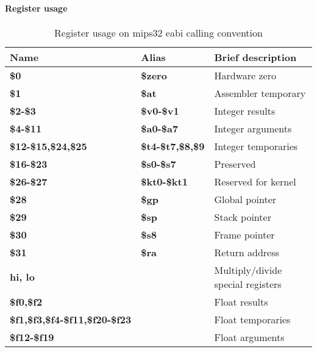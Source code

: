 \paragraph{Register usage}

\begin{table}[h]
\begin{tabular}{lll}
\hline
Name                                   & Alias                   & Brief description\\
\hline
{\bf \$0}                              & {\bf \$zero}            & Hardware zero \\
{\bf \$1}                              & {\bf \$at}              & Assembler temporary \\
{\bf \$2-\$3}                          & {\bf \$v0-\$v1}         & Integer results \\
{\bf \$4-\$11}                         & {\bf \$a0-\$a7}         & Integer arguments\\
{\bf \$12-\$15,\$24,\$25}              & {\bf \$t4-\$t7,\$8,\$9} & Integer temporaries \\
{\bf \$16-\$23}                        & {\bf \$s0-\$s7}         & Preserved \\
{\bf \$26-\$27}                        & {\bf \$kt0-\$kt1}       & Reserved for kernel \\
{\bf \$28}                             & {\bf \$gp}              & Global pointer \\
{\bf \$29}                             & {\bf \$sp}              & Stack pointer \\
{\bf \$30}                             & {\bf \$s8}              & Frame pointer \\
{\bf \$31}                             & {\bf \$ra}              & Return address \\
{\bf hi, lo}                           &                         & Multiply/divide special registers \\
{\bf \$f0,\$f2}                        &                         & Float results \\
{\bf \$f1,\$f3,\$f4-\$f11,\$f20-\$f23} &                         & Float temporaries \\
{\bf \$f12-\$f19}                      &                         & Float arguments \\
\end{tabular}
\caption{Register usage on mips32 eabi calling convention}
\end{table}

